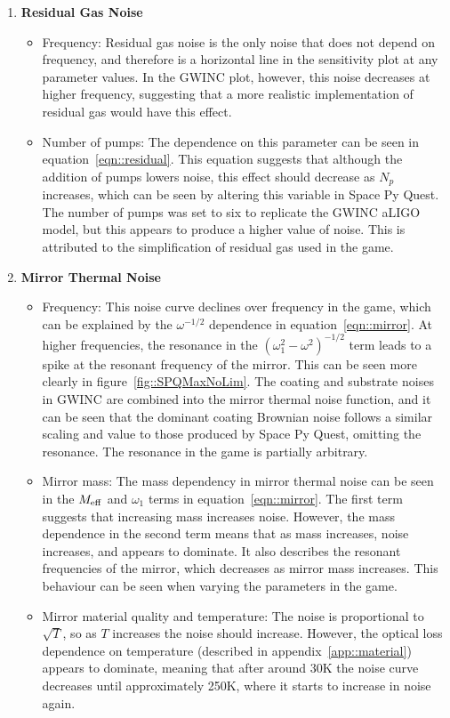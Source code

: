 \documentclass{article}
\begin{document}
\begin{enumerate}
    \item \textbf{Residual Gas Noise} \begin{itemize}
    \item Frequency: Residual gas noise is the only noise that does
      not depend on frequency, and therefore is a horizontal line in
      the sensitivity plot at any parameter values. In the GWINC plot,
      however, this noise decreases at higher frequency, suggesting
      that a more realistic implementation of residual gas would have
      this effect. 
    \item Number of pumps: The dependence on this parameter can be
      seen in equation~\ref{eqn::residual}. This equation suggests
      that although the addition of pumps lowers noise, this effect
      should decrease as $N_p$ increases, which can be seen by
      altering this variable in Space Py Quest. The number of pumps
      was set to six to replicate the GWINC aLIGO model, but this
      appears to produce a higher value of noise. This is attributed
      to the simplification of residual gas used in the game.  
   \end{itemize}
    
    \item \textbf{Mirror Thermal Noise}
    \begin{itemize}
    \item Frequency: This noise curve declines over frequency in the
      game, which can be explained by the $\omega^{-1/2}$ dependence
      in equation~\ref{eqn::mirror}. At higher frequencies, the
      resonance in the $(\omega_1^2-\omega^2)^{-1/2}$ term leads to a
      spike at the resonant frequency of the mirror. This can be seen
      more clearly in figure~\ref{fig::SPQMaxNoLim}. The coating and
      substrate noises in GWINC are combined into the mirror thermal
      noise function, and it can be seen that the dominant coating
      Brownian noise follows a similar scaling and value to those
      produced by Space Py Quest, omitting the resonance. The
      resonance in the game is partially arbitrary. 
    \item Mirror mass: The mass dependency in mirror thermal noise can
      be seen in the $M_{\rm eff}$ and $\omega_1$ terms in
      equation~\ref{eqn::mirror}. The first term suggests that
      increasing mass
      increases noise. However, the mass dependence in the second term
      means that as mass increases, noise increases, and appears to
      dominate. It also describes the resonant frequencies of the
      mirror, which decreases as mirror mass increases. This behaviour
      can be seen when varying the parameters in the game.
    \item Mirror material quality and temperature: The noise is
      proportional to $\sqrt{T}$, so as $T$ increases the noise should
      increase. However, the optical loss dependence on temperature
      (described in appendix~\ref{app::material}) appears to dominate,
      meaning that after around 30K the noise curve decreases until
      approximately 250K, where it starts to increase in noise again. 
	\end{itemize}
    

\end{enumerate}
\end{document}
